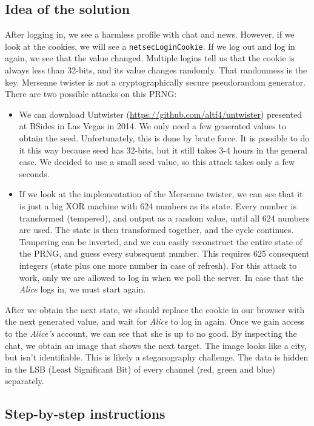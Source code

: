 \documentclass[11pt]{article}
\begin{document}
\subsection{Idea of the solution}
After logging in, we see a harmless profile with chat and news. However, if we look at the cookies, we will see a \texttt{netsecLoginCookie}. If we log out and log in again, we see that the value changed. Multiple logins tell us that the cookie is always less than 32-bits, and its value changes randomly. That randomness is the key. Mersenne twister is not a cryptographically secure pseudorandom generator. There are two possible attacks on this PRNG:
\begin{itemize}
\item We can download Untwister (\url{https://github.com/altf4/untwister}) presented at BSides in Las Vegas in 2014. We only need a few generated values to obtain the seed. Unfortunately, this is done by brute force. It is possible to do it this way because seed has 32-bits, but it still takes 3-4 hours in the general case. We decided to use a small seed value, so this attack takes only a few seconds.
\item  If we look at the implementation of the Mersenne twister, we can see that it is just a big XOR machine with 624 numbers as its state. Every number is transformed (tempered), and output as a random value, until all 624 numbers are used. The state is then transformed together, and the cycle continues. Tempering can be inverted, and we can easily reconstruct the entire state of the PRNG, and guess every subsequent number. This requires 625 consequent integers (state plus one more number in case of refresh). For this attack to work, only we are allowed to log in when we poll the server. In case that the \textit{Alice} logs in, we must start again.
\end{itemize}
After we obtain the next state, we should replace the cookie in our browser with the next generated value, and wait for \textit{Alice} to log in again. Once we gain access to the \textit{Alice's} account, we can see that she is up to no good. By inspecting the chat, we obtain an image that shows the next target. The image looks like a city, but isn't identifiable. This is likely a steganography challenge. The data is hidden in the LSB (Least Significant Bit) of every channel (red, green and blue) separately.

\subsection{Step-by-step instructions}
\end{document}
